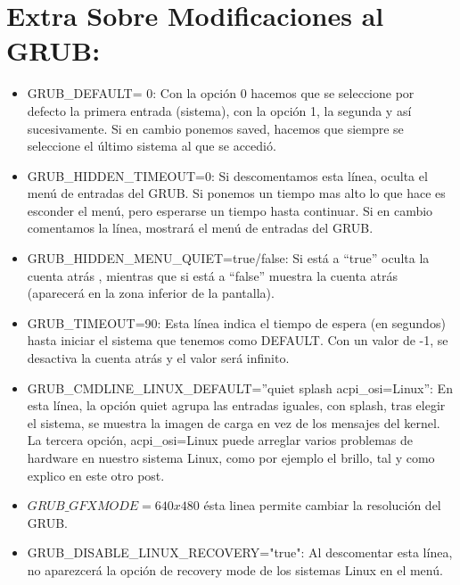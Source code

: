 \documentclass[a4paper, 11pt, oneside]{article}
\begin{document}
\section*{Extra Sobre Modificaciones al GRUB:}
\begin{itemize}
    \item GRUB\_DEFAULT= 0: Con la opción 0 hacemos que se seleccione por defecto la primera entrada (sistema), con la opción 1, la segunda y así sucesivamente. Si en cambio ponemos saved, hacemos que siempre se seleccione el último sistema al que se accedió.
    \item GRUB\_HIDDEN\_TIMEOUT=0: Si descomentamos esta línea, oculta el menú de entradas del GRUB. Si ponemos un tiempo mas alto lo que hace es esconder el menú, pero esperarse un tiempo hasta continuar. Si en cambio comentamos la línea, mostrará el menú de entradas del GRUB.
    \item GRUB\_HIDDEN\_MENU\_QUIET=true/false: Si está a “true” oculta la cuenta atrás , mientras que si está a “false” muestra la cuenta atrás (aparecerá en la zona inferior de la pantalla).
    \item GRUB\_TIMEOUT=90: Esta línea indica el tiempo de espera (en segundos) hasta iniciar el sistema que tenemos como DEFAULT. Con un valor de -1, se desactiva la cuenta atrás y el valor será infinito.
    \item GRUB\_CMDLINE\_LINUX\_DEFAULT=”quiet splash acpi\_osi=Linux”: En esta línea, la opción quiet agrupa las entradas iguales, con splash, tras elegir el sistema, se muestra la imagen de carga en vez de los mensajes del kernel. La tercera opción, acpi\_osi=Linux 
    puede arreglar varios problemas de hardware en nuestro sistema Linux, como por ejemplo el brillo, tal y como explico en este otro post.
    \item $GRUB\_GFXMODE=640x480$ ésta linea permite cambiar la resolución del GRUB.
    \item GRUB\_DISABLE\_LINUX\_RECOVERY="true": Al descomentar esta línea, no aparezcerá la opción de recovery mode de los sistemas Linux en el menú.
    
\end{itemize}
\end{document}
